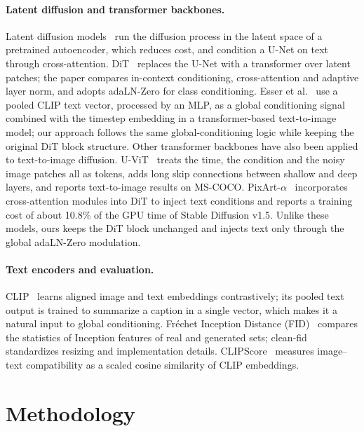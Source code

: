 \documentclass{article}
\begin{document}
\paragraph{Latent diffusion and transformer backbones.}
Latent diffusion models~\cite{rombach2022ldm} run the diffusion process in the latent space of a pretrained autoencoder, which reduces cost, and condition a U-Net on text through cross-attention.
DiT~\cite{peebles2023dit} replaces the U-Net with a transformer over latent patches; the paper compares in-context conditioning, cross-attention and adaptive layer norm, and adopts adaLN-Zero for class conditioning.
Esser et al.~\cite{esser2024sd3} use a pooled CLIP text vector, processed by an MLP, as a global conditioning signal combined with the timestep embedding in a transformer-based text-to-image model; our approach follows the same global-conditioning logic while keeping the original DiT block structure.
Other transformer backbones have also been applied to text-to-image diffusion.
U-ViT~\cite{bao2023uvit} treats the time, the condition and the noisy image patches all as tokens, adds long skip connections between shallow and deep layers, and reports text-to-image results on MS-COCO.
PixArt-$\alpha$~\cite{chen2023pixartalpha} incorporates cross-attention modules into DiT to inject text conditions and reports a training cost of about 10.8\% of the GPU time of Stable Diffusion v1.5.
Unlike these models, ours keeps the DiT block unchanged and injects text only through the global adaLN-Zero modulation.

\paragraph{Text encoders and evaluation.}
CLIP~\cite{radford2021clip} learns aligned image and text embeddings contrastively; its pooled text output is trained to summarize a caption in a single vector, which makes it a natural input to global conditioning.
Fr\'echet Inception Distance (FID)~\cite{heusel2017fid} compares the statistics of Inception features of real and generated sets; clean-fid~\cite{parmar2022cleanfid} standardizes resizing and implementation details.
CLIPScore~\cite{hessel2021clipscore} measures image--text compatibility as a scaled cosine similarity of CLIP embeddings.

\section{Methodology}
\end{document}
